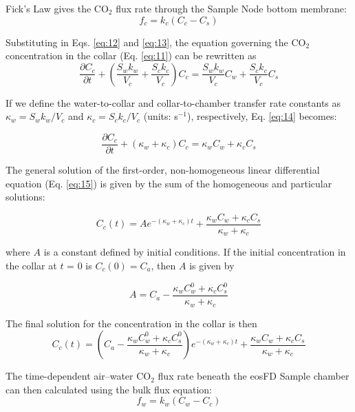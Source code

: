\documentclass[11pt]{article}
\begin{document}
Fick's Law gives the CO$_2$ flux rate through the Sample Node bottom membrane:
\begin{equation} \label{eq:13}
	f_c = k_c(C_c - C_s)
\end{equation}

Substituting in Eqs. \ref{eq:12} and \ref{eq:13}, the equation governing the CO$_2$ concentration in the collar (Eq. \ref{eq:11}) can be rewritten as
\begin{equation} \label{eq:14}
	\frac{\partial C_c}{\partial t} + \left( \frac{S_w k_w}{V_c} + \frac{S_c k_c}{V_c} \right) C_c = \frac{S_w k_w}{V_c} C_w + \frac{S_c k_c}{V_c} C_s
\end{equation}

If we define the water-to-collar and  collar-to-chamber transfer rate constants as $\kappa_w = S_w k_w / V_c$ and $\kappa_c = S_c k_c / V_c$ (units: s$^{-1}$), respectively, Eq. \ref{eq:14}  becomes:

\begin{equation} \label{eq:15}
	\frac{\partial C_c}{\partial t} + ( \kappa_w + \kappa_c) C_c = \kappa_w C_w + \kappa_c C_s
\end{equation}

The general solution of the first-order, non-homogeneous linear differential equation (Eq. \ref{eq:15}) is given by the sum of the homogeneous and particular solutions:

\begin{equation} \label{eq:16}
	C_c(t) = Ae^{-(\kappa_w + \kappa_c)t} + \frac{\kappa_w C_w + \kappa_c C_s}{\kappa_w + \kappa_c}
\end{equation}

where $A$ is a constant defined by initial conditions. If the initial concentration in the collar at $t$ = 0 is $C_c(0) = C_a$, then $A$ is given by

\begin{equation} \label{eq:17}
	A = C_a - \frac{\kappa_w C_w^0 + \kappa_c C_s^0}{\kappa_w + \kappa_c}
\end{equation}

The final solution for the concentration in the collar is then
\begin{equation} \label{eq:18}
	\boxed{ C_c(t) = \left( C_a - \frac{\kappa_w C_w^0 + \kappa_c C_s^0}{\kappa_w + \kappa_c} \right) e^{-(\kappa_w + \kappa_c)t} + \frac{\kappa_w C_w + \kappa_c C_s}{\kappa_w + \kappa_c} }
\end{equation}

The time-dependent air--water CO$_2$ flux rate beneath the eosFD Sample chamber can then calculated using the bulk flux equation:
\begin{equation} \label{eq:19}
	\boxed{ f_w = k_w(C_w - C_c) }
\end{equation}
\end{document}
